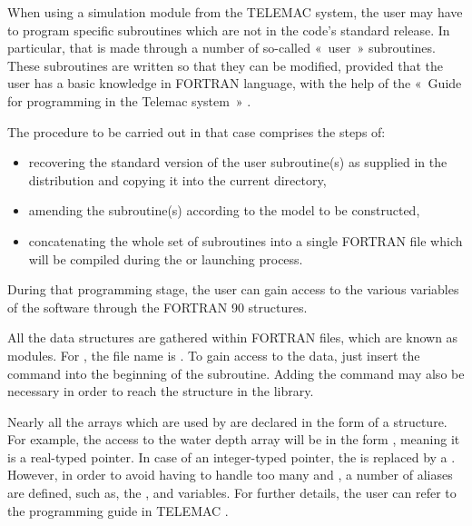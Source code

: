 When using a simulation module from the TELEMAC system, the user may have to
program specific subroutines which are not in the code's standard release. In
particular, that is made through a number of so-called «~user~» subroutines.
These subroutines are written so that they can be modified, provided that the
user has a basic knowledge in FORTRAN language, with the help of the «~Guide
for programming in the Telemac system~» \cite{HervouetProg2009}.

The procedure to be carried out in that case comprises the steps of:

\begin{itemize}
\item recovering the standard version of the user subroutine(s) as supplied in
the distribution and copying it into the current directory,
\item amending the subroutine(s) according to the model to be constructed,
\item concatenating the whole set of subroutines into a single FORTRAN file
which will be compiled during the  or  launching process.
\end{itemize}

During that programming stage, the user can gain access to the various
variables of the software through the FORTRAN 90 structures.

All the data structures are gathered within FORTRAN files, which are known as
modules. For \waqtel, the file name is . To gain
access to the \waqtel data, just insert the command  into the beginning of the subroutine. Adding the
command  may also be necessary in order to reach the structure in the
\bief library.

Nearly all the arrays which are used by \waqtel are declared in the form of
a structure. For example, the access to the water depth array will be in the
form ,  meaning it is a real-typed pointer.
In case of an integer-typed pointer, the  is replaced by a .
However, in order to avoid having to handle too many  and ,
a number of aliases are defined, such as, the ,  and
 variables. For further details, the user can refer to
the programming guide in TELEMAC \cite{HervouetProg2009}.
